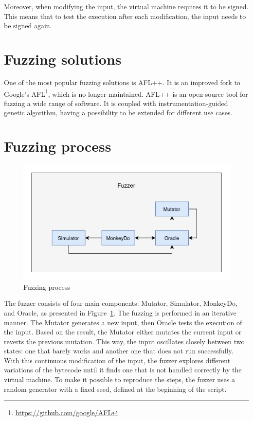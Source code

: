 Moreover, when modifying the input, the virtual machine requires it to be signed.
This means that to test the execution after each modification, the input needs to be signed again.


\section{Fuzzing solutions}
One of the most popular fuzzing solutions is AFL++\cite{aflplusplus}.
It is an improved fork to Google's AFL\footnote{\url{https://github.com/google/AFL}}, which is no longer maintained.
AFL++ is an open-source tool for fuzzing a wide range of software.
It is coupled with instrumentation-guided genetic algorithm, having a possibility to be extended for different use cases.

\section{Fuzzing process}
\begin{figure}[h]
    \centering
    \includegraphics[width=0.8\linewidth]{../../images/fuzzer-diagram}
    \caption{Fuzzing process}
    \label{fig:fuzzer-diagram}
\end{figure}

The fuzzer consists of four main components: Mutator, Simulator, MonkeyDo, and Oracle, as presented in Figure~\ref{fig:fuzzer-diagram}.
The fuzzing is performed in an iterative manner.
The Mutator generates a new input, then Oracle tests the execution of the input.
Based on the result, the Mutator either mutates the current input or reverts the previous mutation.
This way, the input oscillates closely between two states: one that barely works and another one that does not run successfully.
With this continuous modification of the input, the fuzzer explores different variations of the bytecode until it finds one that is not handled correctly by the virtual machine.
To make it possible to reproduce the steps, the fuzzer uses a random generator with a fixed seed, defined at the beginning of the script.


